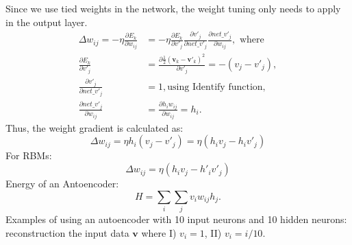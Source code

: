 \documentclass[conference]{IEEEtran}
\begin{document}
	Since we use tied weights in the network, the weight tuning only needs to apply in the output layer.
	\begin{equation}
	\begin{aligned}
	\Delta w_{ij} = -\eta \frac{\partial E_k}{\partial w_{ij}} &= -\eta \frac{\partial E_k}{\partial v'_j} \frac{\partial v'_j}{\partial net\_v'_j} \frac{\partial net\_v'_j}{\partial w_{ij}}, \textrm{ where} \\
	\frac{\partial E_k}{\partial v'_j} &= \frac{\partial \frac{1}{2}(\mathbf{v}_k - \mathbf{v'}_k)^2}{\partial v'_j}= -(v_j - v'_j), \\
	\frac{\partial v'_j}{\partial net\_v'_j} &= 1, \textrm{using Identify function,}\\
	\frac{\partial net\_v'_j}{\partial w_{ij}} &= \frac{\partial h_i w_{ij}}{\partial w_{ij}} = h_i.
	\end{aligned}
	\end{equation}
	Thus, the weight gradient is calculated as:
	\begin{equation}
	\Delta w_{ij} = \eta h_i(v_j - v'_j) = \eta (h_i v_j - h_i v'_j)
	\end{equation}
	For RBMs:
	\begin{equation}
	\Delta w_{ij} = \eta (h_i v_j - h'_i v'_j)
	\end{equation}
	Energy of an Antoencoder:
	\begin{equation}
	H = \sum_{i}\sum_{j} v_i w_{ij} h_j.
	\end{equation}
	Examples of using an autoencoder with 10 input neurons and 10 hidden neurons: reconstruction the input data $\mathbf{v}$ where I) $v_i = 1$, II) $v_i = i/10$.
\end{document}

